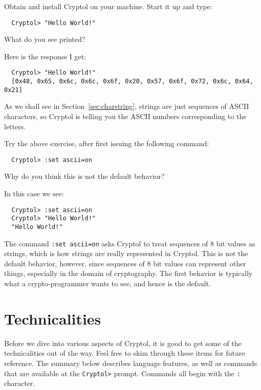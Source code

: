 \begin{Exercise}\label{ex:helloWorld1}
Obtain and install Cryptol on your machine.  Start it up and type:
\begin{Verbatim}
  Cryptol> "Hello World!"
\end{Verbatim}
What do you see printed?
\end{Exercise}
\begin{Answer}
Here is the response I get:
\begin{small}
\begin{Verbatim}
  Cryptol> "Hello World!"
  [0x48, 0x65, 0x6c, 0x6c, 0x6f, 0x20, 0x57, 0x6f, 0x72, 0x6c, 0x64, 0x21]
\end{Verbatim}
\end{small}
As we shall see in Section~\ref{sec:charstring}, strings are just
sequences of ASCII characters, so Cryptol is telling you the ASCII
numbers corresponding to the letters.
\end{Answer}
\begin{Exercise}\label{ex:helloWorld2}
Try the above exercise, after first issuing the following command:
\begin{Verbatim}
  Cryptol> :set ascii=on 
\end{Verbatim}
Why do you think this is not the default behavior?\indSettingASCII
\end{Exercise}
\begin{Answer}
In this case we see:\indSettingASCII
\begin{Verbatim}
  Cryptol> :set ascii=on
  Cryptol> "Hello World!"
  "Hello World!"
\end{Verbatim}
The command {\tt :set ascii=on} asks Cryptol to treat sequences of 8
bit values as strings, which is how strings are really represented in
Cryptol.  This is not the default behavior, however, since sequences
of 8 bit values can represent other things, especially in the domain
of cryptography.  The first behavior is typically what a
crypto-programmer wants to see, and hence is the default.
\end{Answer}

\section{Technicalities}
\label{sec:technicalities}

Before we dive into various aspects of Cryptol, it is good to get some
of the technicalities out of the way. Feel free to skim through these
items for future reference. The summary below describes language
features, as well as commands that are available at the {\tt Cryptol>}
prompt. Commands all begin with the {\tt :} character.

